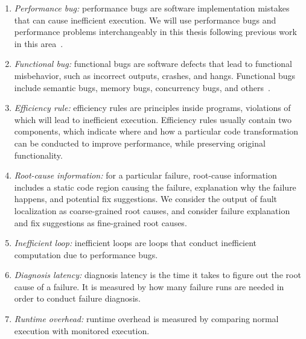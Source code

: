 \begin{nomenclature}

\begin{enumerate}

\item{{\textit{Performance bug:}}}
performance bugs are software implementation mistakes 
that can cause inefficient execution. 
We will use performance bugs
and performance problems interchangeably in this thesis 
following previous work in this 
area~\citep{Alabama,perf.fse10}.


\item{{\textit{Functional bug:}}}
functional bugs are software defects that lead to functional misbehavior, 
such as incorrect outputs, crashes, and hangs. 
Functional bugs include semantic bugs, 
memory bugs, concurrency bugs, and others~\citep{LiASID06}.



\item{{\textit{Efficiency rule:}}}
efficiency rules are principles inside programs, 
violations of which will lead to inefficient execution. 
Efficiency rules usually contain two components, 
which indicate where and how a particular code transformation 
can be conducted to improve performance, 
while preserving original functionality. 


\item{{\textit{Root-cause information:}}}
for a particular failure, root-cause information includes a static code region causing the failure, 
explanation why the failure happens, and potential fix suggestions.
We consider the output of fault localization as coarse-grained root causes, 
and consider failure explanation and fix suggestions as fine-grained root causes. 

\item{{\textit{Inefficient loop:}}}
inefficient loops are loops that conduct inefficient computation due to performance bugs.

\item{{\textit{Diagnosis latency:}}}
diagnosis latency is the time it takes to figure out the root cause of a failure.                    
It is measured by
how many failure runs are needed in order to conduct failure diagnosis. 


\item{{\textit{Runtime overhead:}}}
runtime overhead is measured by comparing normal execution with monitored execution. 




\end{enumerate}
\end{nomenclature}

\begin{abstract}
  
\end{abstract}

\clearpage{}

